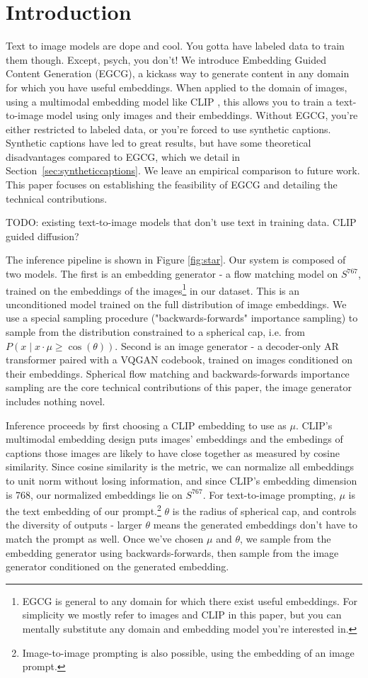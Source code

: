 \documentclass{article} %
\begin{document}
\section{Introduction}

Text to image models are dope and cool. You gotta have labeled data to train them though. Except,
psych, you don't! We introduce Embedding Guided Content Generation (EGCG), a kickass way to generate
content in any domain for which you have useful embeddings. When applied to the domain of images,
using a multimodal embedding model like CLIP \citep{radford2021learning}, this allows you to train a
text-to-image model using only images and their embeddings. Without EGCG, you're either restricted
to labeled data, or you're forced to use synthetic captions. Synthetic captions have led to great
results, but have some theoretical disadvantages compared to EGCG, which we detail in
Section~\ref{sec:syntheticcaptions}. We leave an empirical comparison to future work. This paper
focuses on establishing the feasibility of EGCG and detailing the technical contributions.

TODO: existing text-to-image models that don't use text in training data. CLIP guided diffusion?

The inference pipeline is shown in Figure \ref{fig:star}. Our system is composed of two models. The
first is an embedding generator - a flow matching model on $S^{767}$, trained on the embeddings of
the images\footnote{EGCG is general to any domain for which there exist useful embeddings. For
simplicity we mostly refer to images and CLIP in this paper, but you can mentally substitute any
domain and embedding model you're interested in.} in our dataset. This is an unconditioned model
trained on the full distribution of image embeddings. We use a special sampling procedure
("backwards-forwards" importance sampling) to sample from the distribution constrained to a
spherical cap, i.e. from $P(x \mid x \cdot \mu \geq \cos(\theta))$. Second is an image generator - a
decoder-only AR transformer paired with a VQGAN codebook, trained on images conditioned on their
embeddings. Spherical flow matching and backwards-forwards importance sampling are the core technical
contributions of this paper, the image generator includes nothing novel.

Inference proceeds by first choosing a CLIP embedding to use as $\mu$. CLIP's multimodal embedding
design puts images' embeddings and the embedings of captions those images are likely to have close
together as measured by cosine similarity. Since cosine similarity is the metric, we can normalize
all embeddings to unit norm without losing information, and since CLIP's embedding dimension is 768,
our normalized embeddings lie on $S^{767}$. For text-to-image prompting, $\mu$ is the text embedding
of our prompt.\footnote{Image-to-image prompting is also possible, using the embedding of an image
prompt.} $\theta$ is the radius of spherical cap, and controls the diversity of outputs - larger
$\theta$ means the generated embeddings don't have to match the prompt as well. Once we've chosen
$\mu$ and $\theta$, we sample from the embedding generator using backwards-forwards, then sample
from the image generator conditioned on the generated embedding.
\end{document}
